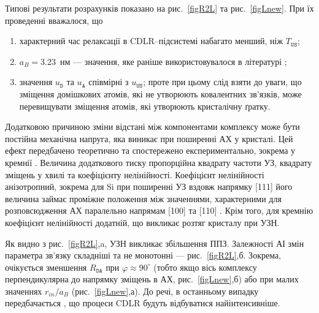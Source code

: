 Типові результати розрахунків показано на рис.~\ref{figR2L} та рис.~\ref{figLnew}.
При їх проведенні вважалося, що
\begin{enumerate}[label=\asbuk*),leftmargin=0em,itemindent=1.5em]
\item характерний час релаксації в CDLR--підсистемі набагато менший, ніж $T_\mathtt{US}$;
\item $a_B=3.23$~нм --- значення, яке раніше використовувалося в літературі \cite{CDLR:JAP};
\item значення $u_\mathtt{D}$ та $u_\mathtt{A}$ співмірні з $u_\mathtt{US}$;
   проте при цьому слід взяти до уваги, що зміщення домішкових атомів, які не утворюють ковалентних зв'язків, може перевищувати
   зміщення атомів, які утворюють кристалічну ґратку.
\end{enumerate}

Додатковою причиною зміни відстані між компонентами комплексу може бути постійна механічна напруга,
яка виникає при поширенні АХ у кристалі.
Цей ефект передбачено теоретично \cite{Thurston,StaticStrain:PhysRevB30I} та
спостережено експериментально, зокрема у кремнії \cite{StaticStrain:PhysRevB30II}.
Величина додаткового тиску пропорційна квадрату частоти УЗ, квадрату зміщень у хвилі та коефіцієнту нелінійності\cite{StaticStrain:PhysRevB30II}.
Коефіцієнт нелінійності анізотропний, зокрема для Si при
поширенні УЗ вздовж напрямку [111] його величина займає проміжне положення між значеннями, характерними для розповсюдження АХ
паралельно напрямам [100] та [110] \cite{NelinSi}.
Крім того, для кремнію коефіцієнт нелінійності додатній, що викликає розтяг кристалу при УЗН.




Як видно з рис.~\ref{figR2L},a, УЗН викликає збільшення ППЗ.
Залежності АІ змін параметра зв'язку складніші та не монотонні --- рис.~\ref{figR2L},б.
Зокрема, очікується  зменшення $R_{\mathtt{DA}}$ при $\varphi\approx90^\circ$ (тобто якщо вісь комплексу перпендикулярна до напрямку зміщень в АХ, рис.~\ref{figLnew},б)
або при малих значеннях $r_{in}/a_B$ (рис.~\ref{figLnew},а).
До речі, в останньому випадку передбачається \cite{CDLR:JAP1995,CDLR:JAP}, що процеси CDLR будуть відбуватися найінтенсивніше.

